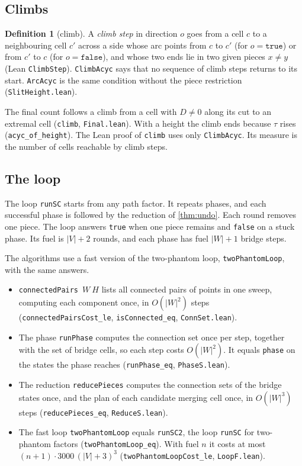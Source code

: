 \documentclass[11pt]{article}
\theoremstyle{plain}
\theoremstyle{definition}
\newtheorem{definition}[theorem]{Definition}
\theoremstyle{remark}
\newcommand{\lean}[1]{\texttt{#1}}
\begin{document}
\subsection{Climbs}

\begin{definition}[climb]
\label{def:climb}
A \emph{climb step} in direction $o$ goes from a cell $c$ to a neighbouring cell $c'$ across a
side whose arc points from $c$ to $c'$ (for $o=\lean{true}$) or from $c'$ to $c$ (for
$o=\lean{false}$), and whose two ends lie in two given pieces $x\ne y$ (Lean \lean{ClimbStep}).
\lean{ClimbAcyc} says that no sequence of climb steps returns to its start.
\lean{ArcAcyc} is the same condition without the piece restriction (\lean{SlitHeight.lean}).
\end{definition}

The final count follows a climb from a cell with $D\ne0$ along its cut to an extremal cell
(\lean{climb}, \lean{Final.lean}).
With a height the climb ends because $\tau$ rises (\lean{acyc\_of\_height}).
The Lean proof of \lean{climb} uses only \lean{ClimbAcyc}.
Its measure is the number of cells reachable by climb steps.

\subsection{The loop}
\label{sec:loop}

The loop \lean{runSC} starts from any path factor.
It repeats phases, and each successful phase is followed by the reduction of \cref{thm:undo}.
Each round removes one piece.
The loop answers \lean{true} when one piece remains and \lean{false} on a stuck phase.
Its fuel is $|V|+2$ rounds, and each phase has fuel $|W|+1$ bridge steps.

The algorithms use a fast version of the two-phantom loop, \lean{twoPhantomLoop}, with the same answers.
\begin{itemize}
\item \lean{connectedPairs}~$W\ H$ lists all connected pairs of points in one sweep, computing each
  component once, in $O(|W|^2)$ steps (\lean{connectedPairsCost\_le}, \lean{isConnected\_eq},
  \lean{ConnSet.lean}).
\item The phase \lean{runPhase} computes the connection set once per step, together with the set of
  bridge cells, so each step costs $O(|W|^2)$.
  It equals \lean{phase} on the states the phase reaches (\lean{runPhase\_eq}, \lean{PhaseS.lean}).
\item The reduction \lean{reducePieces} computes the connection sets of the bridge states once, and
  the plan of each candidate merging cell once, in $O(|W|^3)$ steps (\lean{reducePieces\_eq},
  \lean{ReduceS.lean}).
\item The fast loop \lean{twoPhantomLoop} equals \lean{runSC2}, the loop \lean{runSC} for
  two-phantom factors (\lean{twoPhantomLoop\_eq}).
  With fuel $n$ it costs at most $(n+1)\cdot 3000\,(|V|+3)^3$ (\lean{twoPhantomLoopCost\_le},
  \lean{LoopF.lean}).
\end{itemize}
\end{document}
